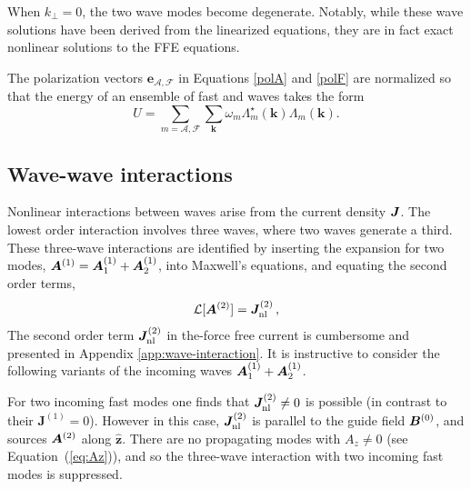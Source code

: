 When $k_\perp=0$, the two wave modes become degenerate. Notably, while these wave solutions have been derived from the linearized equations, they are in fact exact nonlinear solutions to the FFE equations.

The polarization vectors $\boldsymbol{e}_{\mathcal{A},\mathcal{F}}$ in Equations \ref{polA} and \ref{polF} are normalized so that the energy of an ensemble of fast and \alfven waves takes the form
%
\begin{equation}
	U =\sum\limits_{m=\mathcal{A},\mathcal{F}} \sum\limits_{\boldsymbol{k}}\omega_m
\Lambda_m^\star(\boldsymbol{k})
\Lambda_m(\boldsymbol{k}).
\end{equation}
%

\subsection{Wave-wave interactions}
%
Nonlinear interactions between waves arise from the current density $\boldsymbol{J}$.
The lowest order interaction involves three waves, where two waves generate a third. These three-wave interactions are identified by inserting the expansion for two modes, $\boldsymbol{A}^{(1)} = \boldsymbol{A}^{(1)}_1 + \boldsymbol{A}^{(1)}_2$, into Maxwell's equations, and equating the second order terms,
%
\begin{eqnarray}\label{Maxwell2}
	\mathcal{L}[\boldsymbol{A}^{(2)}] =  \boldsymbol{J}^{(2)}_{\rm nl} \, ,
\end{eqnarray}
The second order term $\boldsymbol{J}^{(2)}_{\rm nl}$ in the-force free current is cumbersome and presented in Appendix \ref{app:wave-interaction}. It is instructive to consider the following variants of the incoming waves $\boldsymbol{A}^{(1)}_1+\boldsymbol{A}^{(1)}_2$.

For two incoming fast modes one finds that $\boldsymbol{J}_{\rm nl}^{(2)}\neq 0$ is possible (in contrast to their $\boldsymbol{J}^{(1)}=0$). However in this case, $\boldsymbol{J}_{\rm nl}^{(2)}$ is parallel to the guide field $\boldsymbol{B}^{(0)}$, and  sources $\boldsymbol{A}^{(2)}$ along $\hat {\boldsymbol{z}}$. 
There are no propagating modes with $A_z\neq 0$ (see Equation~(\ref{eq:Az})), and so the three-wave interaction with two incoming fast modes is suppressed. 


